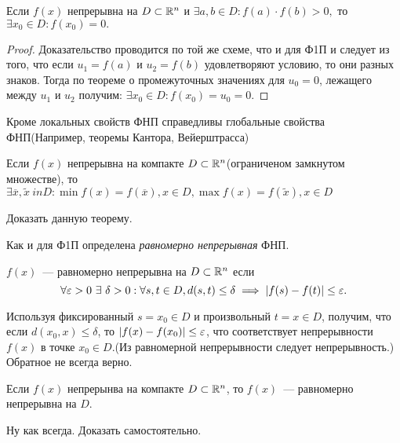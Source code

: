 \documentclass[../../main.tex]{subfiles}
\begin{document}
    \begin{crl*}
			Если $f(x)$ непрерывна на $D \subset \mathbb{R}^n$ и $\exists a,b \in D: 
			f(a) \cdot f(b) > 0,$ то $\exists x_0 \in D : f(x_0) = 0.$
	\end{crl*}
    \begin{proof}
    	Доказательство проводится по той же схеме, что и для Ф1П и следует из 
    	того, что если $u_1 = f(a)$ и $u_2 = f(b)$ удовлетворяют условию, то 
    	они разных знаков. Тогда по теореме о промежуточных значениях для 
    	$u_0 = 0$, лежащего между $u_1$ и $u_2$ получим:
    	$\exists x_0 \in D: f(x_0) = u_0 = 0.$ 
    \end{proof}
	Кроме локальных свойств ФНП справедливы глобальные свойства ФНП(Например,
	теоремы Кантора, Вейерштрасса)
	\begin{thm}
		Если $f(x)$ непрерывна на компакте $D \subset \mathbb{R}^n$(ограниченом 
		замкнутом множестве), то $\exists \overline{x}, \widetilde{x}\ in D :
		\min f(x) = f(\overline{x}), x \in D, \max f(x) = f(\widetilde{x}), x 
		\in D$
	\end{thm}
	\begin{exc}
		Доказать данную теорему.
	\end{exc}
	Как и для Ф1П определена \emph{равномерно непрерывная} ФНП.
	\begin{defn}
		$f(x)$~--- равномерно непрерывна на $D \subset \mathbb{R}^n$ если 
		\[
			\forall \eps > 0 \ \exists \ \delta > 0 : \forall s, t \in D,
			d(s, t) \leq \delta \implies |f(s) - f(t)| \leq \eps.
		\]
	\end{defn}
	Используя фиксированный $s = x_0 \in D$ и произвольный $t = x \in D$, 
	получим, что если $d(x_0, x) \leq \delta$, то $|f(x) - f(x_0)| \leq \varepsilon$,
	что соответствует непрерывности $f(x)$ в точке $x_0 \in D$.(Из равномерной 
	непрерывности следует непрерывность.) Обратное не всегда верно.
	\begin{thm}
		Если $f(x)$ непрерынва на компакте $D \subset \mathbb{R}^n$, то $f(x)$~---
		равномерно непрерывна на $D$.
	\end{thm} 
	\begin{exc}
		Ну как всегда. Доказать самостоятельно.
	\end{exc}
\end{document}
